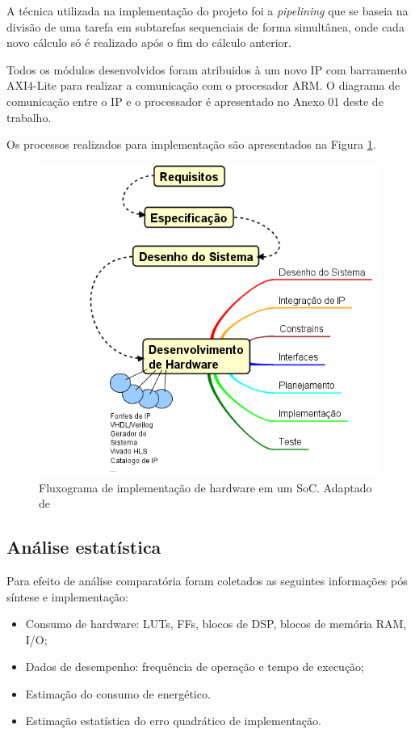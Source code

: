 A técnica utilizada na implementação do projeto foi a \textit{pipelining} que se baseia na divisão de uma tarefa em subtarefas sequenciais de forma simultânea, onde cada novo cálculo só é realizado após o fim do cálculo anterior. 

Todos os módulos desenvolvidos foram atribuidos à um novo IP com barramento AXI4-Lite
para realizar a comunicação com o procesador ARM. O diagrama de comunicação entre o IP e o processador é apresentado no Anexo 01 deste de trabalho.

Os processos realizados para implementação são apresentados na Figura \ref{diagram_hardware}.

\begin{figure}[h]
  \centering
  \includegraphics[keepaspectratio=true,scale=1.0]{figuras/fluxograma_hardware.PNG}
  \caption{Fluxograma de implementação de hardware em um SoC. Adaptado de \cite{zynqBook}}
  \label{diagram_hardware}
\end{figure}

\subsection{Análise estatística}
Para efeito de análise comparatória foram coletados as seguintes informações pós síntese e implementação:

\begin{itemize}[noitemsep]
	\item Consumo de hardware: LUTs, FFs, blocos de DSP, blocos de memória RAM, I/O;
	\item Dados de desempenho: frequência de operação e tempo de execução;
	\item Estimação do consumo de energético.
	\item Estimação estatística do erro quadrático de implementação.
\end{itemize}

